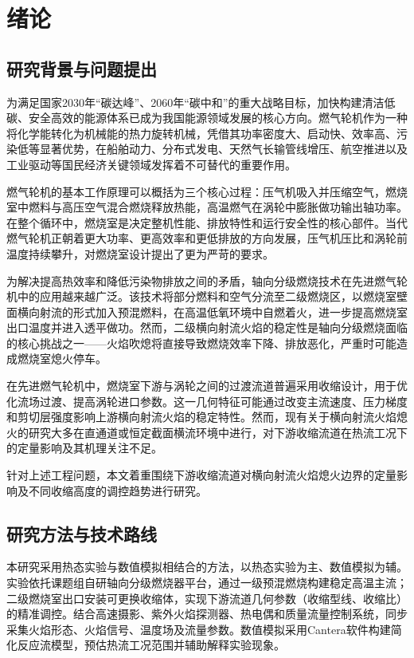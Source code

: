 
\chapter{绪论}
\section{研究背景与问题提出}

为满足国家2030年“碳达峰”、2060年“碳中和”的重大战略目标，加快构建清洁低碳、安全高效的能源体系已成为我国能源领域发展的核心方向。燃气轮机作为一种将化学能转化为机械能的热力旋转机械，凭借其功率密度大、启动快、效率高、污染低等显著优势，在船舶动力、分布式发电、天然气长输管线增压、航空推进以及工业驱动等国民经济关键领域发挥着不可替代的重要作用。

燃气轮机的基本工作原理可以概括为三个核心过程：压气机吸入并压缩空气，燃烧室中燃料与高压空气混合燃烧释放热能，高温燃气在涡轮中膨胀做功输出轴功率。在整个循环中，燃烧室是决定整机性能、排放特性和运行安全性的核心部件。当代燃气轮机正朝着更大功率、更高效率和更低排放的方向发展，压气机压比和涡轮前温度持续攀升，对燃烧室设计提出了更为严苛的要求。

为解决提高热效率和降低污染物排放之间的矛盾，轴向分级燃烧技术在先进燃气轮机中的应用越来越广泛。该技术将部分燃料和空气分流至二级燃烧区，以燃烧室壁面横向射流的形式加入预混燃料，在高温低氧环境中自燃着火，进一步提高燃烧室出口温度并进入透平做功。然而，二级横向射流火焰的稳定性是轴向分级燃烧面临的核心挑战之一——火焰吹熄将直接导致燃烧效率下降、排放恶化，严重时可能造成燃烧室熄火停车。

在先进燃气轮机中，燃烧室下游与涡轮之间的过渡流道普遍采用收缩设计，用于优化流场过渡、提高涡轮进口参数。这一几何特征可能通过改变主流速度、压力梯度和剪切层强度影响上游横向射流火焰的稳定特性。然而，现有关于横向射流火焰熄火的研究大多在直通道或恒定截面横流环境中进行，对下游收缩流道在热流工况下的定量影响及其机理关注不足。

针对上述工程问题，本文着重围绕下游收缩流道对横向射流火焰熄火边界的定量影响及不同收缩高度的调控趋势进行研究。

\section{研究方法与技术路线}

本研究采用热态实验与数值模拟相结合的方法，以热态实验为主、数值模拟为辅。实验依托课题组自研轴向分级燃烧器平台，通过一级预混燃烧构建稳定高温主流；二级燃烧室出口安装可更换收缩体，实现下游流道几何参数（收缩型线、收缩比）的精准调控。结合高速摄影、紫外火焰探测器、热电偶和质量流量控制系统，同步采集火焰形态、火焰信号、温度场及流量参数。数值模拟采用Cantera软件构建简化反应流模型，预估热流工况范围并辅助解释实验现象。

